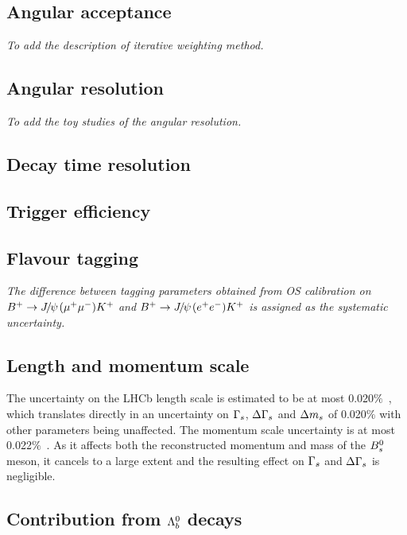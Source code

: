 \subsection{Angular acceptance}

{\it To add the description of iterative weighting method.}

\subsection{Angular resolution}\label{subsec:Syst:AngRes}

{\it To add the toy studies of the angular resolution.}

\subsection{Decay time resolution}


\subsection{Trigger efficiency}


\subsection{Flavour tagging}\label{subsec:Syst:FT}

{\it The difference between tagging parameters obtained from OS calibration on ${{{B}^+}}\rightarrow{\ensuremath{{J\mskip -3mu/\mskip -2mu\psi\mskip 2mu}}}({\mu^+\mu^-}){{K}^+}$ and ${{{B}^+}}\rightarrow{\ensuremath{{J\mskip -3mu/\mskip -2mu\psi\mskip 2mu}}}({e^+e^-}){{K}^+}$ is assigned as the systematic uncertainty. }


\subsection{Length and momentum scale}

The uncertainty on the LHCb length scale is estimated to be at most 0.020$\%$~\cite{LHCb:ANA-2012-053}, which translates directly in an uncertainty on ${\Gamma_{{s}}}$, ${\Delta\Gamma_{{s}}}$ and ${\Delta m_{{s}}}$ of 0.020$\%$ with other parameters being unaffected. The momentum scale uncertainty is at most 0.022$\%$~\cite{LHCb:ANA-2012-053}. As it affects both the reconstructed momentum and mass of the ${{B}^0_{s}}$ meson, it cancels to a large extent and the resulting effect on ${\Gamma_{{s}}}$ and ${\Delta\Gamma_{{s}}}$ is negligible.

\subsection{Contribution from ${{\Lambda}^0_{b}}$ decays}


